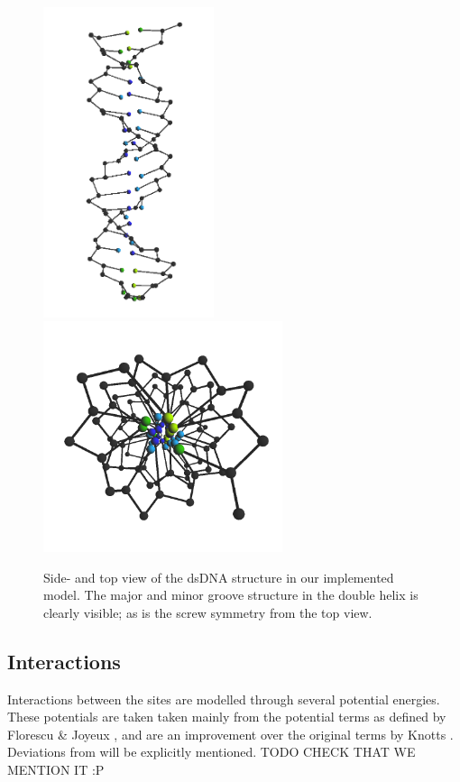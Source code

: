 \begin{figure}[h]
\begin{center}
\includegraphics[width=5cm]{images/methods_dnaStructure1} \includegraphics[width=7cm]{images/methods_dnaStructure2}

\end{center}\label{methods_dnaStructure}
\caption{Side- and top view of the dsDNA structure in our implemented model. The major and minor groove structure in the double helix is clearly visible; as is the screw symmetry from the top view.}
\end{figure}










\subsection{Interactions}
Interactions between the sites are modelled through several potential energies.
These potentials are taken taken mainly from the potential terms as defined by Florescu \& Joyeux \cite{florescu2011thermal}, and are an improvement over the original terms by Knotts \etal \cite{knotts2007coarse}. Deviations from \cite{florescu2011thermal} will be explicitly mentioned.
TODO CHECK THAT WE MENTION IT :P

